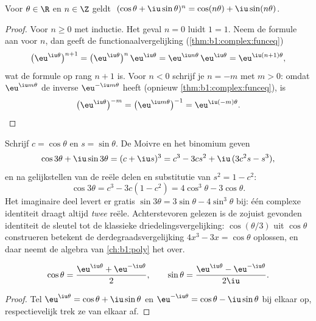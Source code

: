 \begin{corollary}\label{cor:b1:complex:demoivre}
Voor $\theta \in \R$ en $n \in \Z$ geldt $\;(\cos\theta +
\iu\sin\theta)^n = \cos(n\theta) + \iu\sin(n\theta)$.
\end{corollary}

\begin{proof}
Voor $n \geq 0$ met inductie. Het geval $n = 0$ luidt $1 = 1$. Neem de
formule aan voor $n$, dan geeft de functionaalvergelijking
(\cref{thm:b1:complex:funceq})
\[
\bigl(\eu^{\iu\theta}\bigr)^{n+1}
= \bigl(\eu^{\iu\theta}\bigr)^{n}\,\eu^{\iu\theta}
= \eu^{\iu n\theta}\,\eu^{\iu\theta}
= \eu^{\iu(n+1)\theta} ,
\]
wat de formule op rang $n + 1$ is. Voor $n < 0$ schrijf je $n = -m$ met
$m > 0$: omdat $\eu^{\iu m\theta}$ de inverse $\eu^{-\iu m\theta}$ heeft
(opnieuw \cref{thm:b1:complex:funceq}), is
\[
\bigl(\eu^{\iu\theta}\bigr)^{-m}
= \bigl(\eu^{\iu m\theta}\bigr)^{-1}
= \eu^{\iu(-m)\theta} . \qedhere
\]
\end{proof}

\begin{example}\label{ex:b1:complex:cos3}
Schrijf $c = \cos\theta$ en $s = \sin\theta$. De Moivre en het binomium
geven
\[
\cos 3\theta + \iu \sin 3\theta = (c + \iu s)^3
= c^3 - 3cs^2 + \iu\,(3c^2 s - s^3),
\]
en na gelijkstellen van de reële delen en substitutie van $s^2 = 1 -
c^2$:
\[
\cos 3\theta = c^3 - 3c(1 - c^2) = 4\cos^3\theta - 3\cos\theta .
\]
Het imaginaire deel levert er gratis $\sin 3\theta = 3\sin\theta -
4\sin^3\theta$ bij: één complexe identiteit draagt altijd \emph{twee}
reële. Achterstevoren gelezen is de zojuist gevonden identiteit de
sleutel tot de klassieke driedelingsvergelijking: $\cos(\theta/3)$ uit
$\cos\theta$ construeren betekent de derdegraadsvergelijking $4x^3 - 3x
= \cos\theta$ oplossen, en daar neemt de algebra van \cref{ch:b1:poly}
het over.
\end{example}

\begin{proposition}\label{prop:b1:complex:euler}
\[
\cos\theta = \frac{\eu^{\iu\theta} + \eu^{-\iu\theta}}{2},
\qquad
\sin\theta = \frac{\eu^{\iu\theta} - \eu^{-\iu\theta}}{2\iu}.
\]
\end{proposition}

\begin{proof}
Tel $\eu^{\iu\theta} = \cos\theta + \iu\sin\theta$ en $\eu^{-\iu\theta} =
\cos\theta - \iu\sin\theta$ bij elkaar op, respectievelijk trek ze van
elkaar af.
\end{proof}

